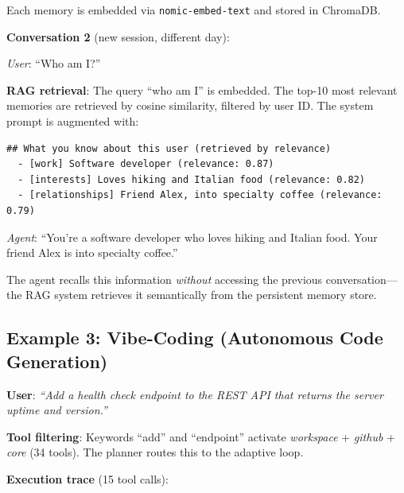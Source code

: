 Each memory is embedded via \texttt{nomic-embed-text} and stored in ChromaDB.

\textbf{Conversation 2} (new session, different day):

\textit{User}: ``Who am I?''

\textbf{RAG retrieval}: The query ``who am I'' is embedded. The top-10 most relevant memories are retrieved by cosine similarity, filtered by user ID. The system prompt is augmented with:

\begin{lstlisting}[caption={RAG-injected context}]
## What you know about this user (retrieved by relevance)
  - [work] Software developer (relevance: 0.87)
  - [interests] Loves hiking and Italian food (relevance: 0.82)
  - [relationships] Friend Alex, into specialty coffee (relevance: 0.79)
\end{lstlisting}

\textit{Agent}: ``You're a software developer who loves hiking and Italian food. Your friend Alex is into specialty coffee.''

The agent recalls this information \textit{without} accessing the previous conversation---the RAG system retrieves it semantically from the persistent memory store.

\subsection{Example 3: Vibe-Coding (Autonomous Code Generation)}

\textbf{User}: \textit{``Add a health check endpoint to the REST API that returns the server uptime and version.''}

\textbf{Tool filtering}: Keywords ``add'' and ``endpoint'' activate \textit{workspace} + \textit{github} + \textit{core} (34 tools). The planner routes this to the adaptive loop.

\textbf{Execution trace} (15 tool calls):

